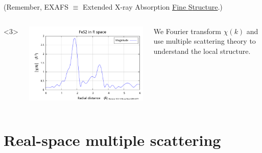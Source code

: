 \documentclass[10pt, xcolor=x11names, compress]{beamer}
\begin{document}
\begin{frame}
\begin{columns}
\begin{column}{0.65\linewidth}
      {\scriptsize (Remember, \alert{EXAFS} $\equiv$ \alert{E}xtended
        \alert{X}-ray \alert{A}bsorption \underline{\alert{F}ine
        \alert{S}tructure}.)}
    \end{column}
  \end{columns}
  \begin{columns}<3>
    \begin{column}{0.35\linewidth}
      \includegraphics[width=\linewidth]{images/FeS2_chir.png}
    \end{column}
    \begin{column}{0.65\linewidth}
      We Fourier transform $\chi(k)$ and use \alert{multiple scattering
        theory} to understand the local structure.
    \end{column}
  \end{columns}
\end{frame}

\section{Real-space multiple scattering}





\newcommand{\FeLeft}{0.60\linewidth}
\newcommand{\FeRight}{0.38\linewidth}
\newcommand{\FeCluster}{0.65\linewidth}
\newcommand{\FePlot}{0.78\linewidth}
\end{document}
